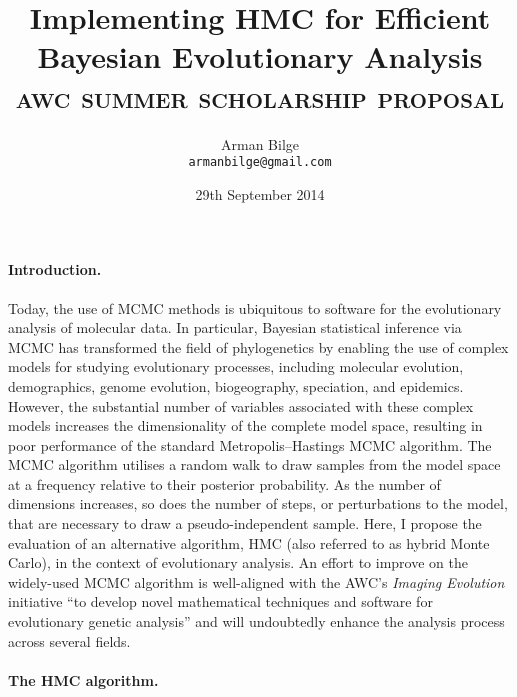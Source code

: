 \documentclass{article}
\title{Implementing \acl{HMC} for Efficient Bayesian Evolutionary Analysis \\
           \Large\textsc{awc summer scholarship proposal}}
\author{Arman Bilge \\ \texttt{armanbilge@gmail.com}}
\date{29th September 2014}
\begin{document}
    \maketitle

    \paragraph{Introduction.}

    Today, the use of \ac{MCMC} methods is ubiquitous to software for the
        evolutionary analysis of molecular data.
    In particular, Bayesian statistical inference via \ac{MCMC} has transformed
        the field of phylogenetics by enabling the use of complex models for
        studying evolutionary processes, including molecular evolution,
        demographics, genome evolution, biogeography, speciation, and
        epidemics.
    However, the substantial number of variables associated with these complex
        models increases the dimensionality of the complete model space,
        resulting in poor performance of the standard Metropolis--Hastings MCMC
        algorithm.
    The \ac{MCMC} algorithm utilises a random walk to draw samples from the
        model space at a frequency relative to their posterior probability.
    As the number of dimensions increases, so does the number of steps, or
        perturbations to the model, that are necessary to draw a
        pseudo-independent sample.
    Here, I propose the evaluation of an alternative algorithm, \ac{HMC} (also
        referred to as hybrid Monte Carlo), in the context of evolutionary
        analysis.
    An effort to improve on the widely-used \ac{MCMC} algorithm is well-aligned
        with the \acl{AWC}'s \emph{Imaging Evolution} initiative \enquote{to
        develop novel mathematical techniques and software for evolutionary
        genetic analysis} and will undoubtedly enhance the analysis process
        across several fields.

    \paragraph*{The \ac{HMC} algorithm.}
\end{document}
